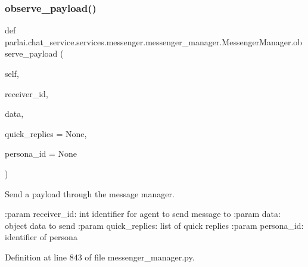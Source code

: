 \subsubsection{\texorpdfstring{observe\+\_\+payload()}{observe\_payload()}}
{\footnotesize\ttfamily def parlai.\+chat\+\_\+service.\+services.\+messenger.\+messenger\+\_\+manager.\+Messenger\+Manager.\+observe\+\_\+payload (\begin{DoxyParamCaption}\item[{}]{self,  }\item[{}]{receiver\+\_\+id,  }\item[{}]{data,  }\item[{}]{quick\+\_\+replies = {\ttfamily None},  }\item[{}]{persona\+\_\+id = {\ttfamily None} }\end{DoxyParamCaption})}

\begin{DoxyVerb}Send a payload through the message manager.

:param receiver_id:
    int identifier for agent to send message to
:param data:
    object data to send
:param quick_replies:
    list of quick replies
:param persona_id:
    identifier of persona
\end{DoxyVerb}
 

Definition at line 843 of file messenger\+\_\+manager.\+py.


